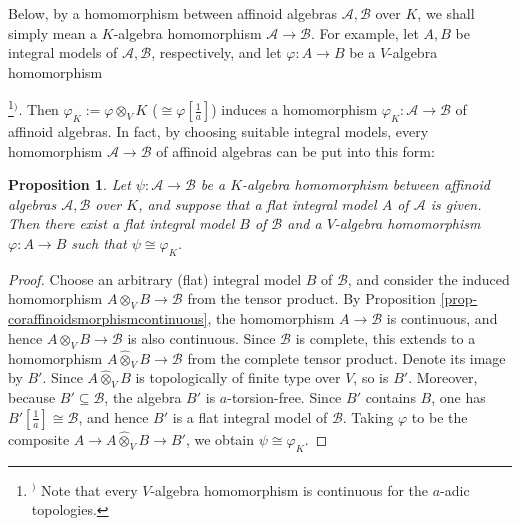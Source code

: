 \documentclass[a4paper,12pt, dvipdfmx]{jsbook}
\theoremstyle{plain}
\newtheorem{prop}[thm]{\bfseries Proposition}
\theoremstyle{definition}
\newcounter{chushaku}
\def\chu#1{\addtocounter{chushaku}{1}\footnote[\value{chushaku}]{${}^)$ #1}${}^)$}
\begin{document}
Below, by a homomorphism between affinoid algebras $\mathcal{A},\mathcal{B}$ over $K$, we shall simply mean a $K$-algebra homomorphism $\mathcal{A}\rightarrow\mathcal{B}$.
For example, let $A,B$ be integral models of $\mathcal{A},\mathcal{B}$, respectively, and let $\varphi\colon A\rightarrow B$ be a $V$-algebra homomorphism\chu{Note that every $V$-algebra homomorphism is continuous for the $a$-adic topologies.}. Then $\varphi_K:=\varphi\otimes_VK$ ($\cong\varphi[\frac{1}{a}]$) induces a homomorphism $\varphi_K\colon\mathcal{A}\rightarrow\mathcal{B}$ of affinoid algebras.
In fact, by choosing suitable integral models, every homomorphism $\mathcal{A}\rightarrow\mathcal{B}$ of affinoid algebras can be put into this form:
\begin{prop}\label{prop-homomorphismsaffinoidalgebras}{\rm 
Let $\psi\colon\mathcal{A}\rightarrow\mathcal{B}$ be a $K$-algebra homomorphism between affinoid algebras $\mathcal{A},\mathcal{B}$ over $K$, and suppose that a flat integral model $A$ of $\mathcal{A}$ is given.
Then there exist a flat integral model $B$ of $\mathcal{B}$ and a $V$-algebra homomorphism $\varphi\colon A\rightarrow B$ such that $\psi\cong\varphi_K$.}
\end{prop}

\begin{proof}[Proof]
Choose an arbitrary (flat) integral model $B$ of $\mathcal{B}$, and consider the induced homomorphism $A\otimes_VB\rightarrow\mathcal{B}$ from the tensor product.
By Proposition \ref{prop-coraffinoidsmorphismcontinuous}, the homomorphism $A\rightarrow\mathcal{B}$ is continuous, and hence $A\otimes_VB\rightarrow\mathcal{B}$ is also continuous.
Since $\mathcal{B}$ is complete, this extends to a homomorphism $A\widehat{\otimes}_VB\rightarrow\mathcal{B}$ from the complete tensor product.
Denote its image by $B'$.
Since $A\widehat{\otimes}_VB$ is topologically of finite type over $V$, so is $B'$.
Moreover, because $B'\subseteq\mathcal{B}$, the algebra $B'$ is $a$-torsion-free.
Since $B'$ contains $B$, one has $B'[\frac{1}{a}]\cong\mathcal{B}$, and hence $B'$ is a flat integral model of $\mathcal{B}$.
Taking $\varphi$ to be the composite $A\rightarrow A\widehat{\otimes}_VB\rightarrow B'$, we obtain $\psi\cong\varphi_K$.
\end{proof}
\end{document}
